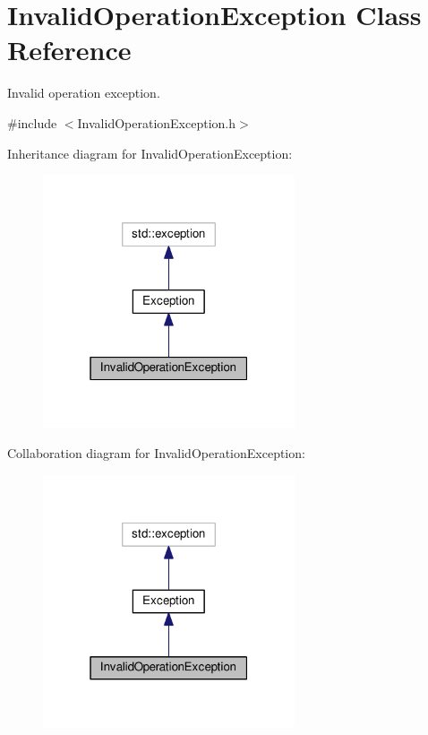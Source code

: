 \hypertarget{classInvalidOperationException}{}\section{Invalid\+Operation\+Exception Class Reference}
\label{classInvalidOperationException}


Invalid operation exception.  




{\ttfamily \#include $<$Invalid\+Operation\+Exception.\+h$>$}



Inheritance diagram for Invalid\+Operation\+Exception\+:
\nopagebreak
\begin{figure}[H]
\begin{center}
\leavevmode
\includegraphics[width=211pt]{classInvalidOperationException__inherit__graph}
\end{center}
\end{figure}


Collaboration diagram for Invalid\+Operation\+Exception\+:
\nopagebreak
\begin{figure}[H]
\begin{center}
\leavevmode
\includegraphics[width=211pt]{classInvalidOperationException__coll__graph}
\end{center}
\end{figure}
